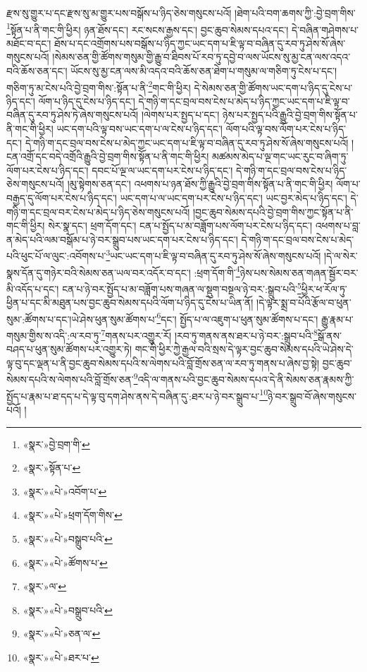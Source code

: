 རྫས་སུ་གྱུར་པ་དང་རྫས་སུ་མ་གྱུར་པས་བསྒོས་པ་ཉིད་ཅེས་གསུངས་པའོ། །ཐེག་པའི་བག་ཆགས་ཀྱི་:བྱེ་བྲག་གིས་\footnote{«སྣར་»བྱེ་བྲག་གི་}སྟོན་པ་ནི་གང་གི་ཕྱིར། ཉན་ཐོས་དང་། རང་སངས་རྒྱས་དང་། བྱང་ཆུབ་སེམས་དཔའ་དང་། དེ་བཞིན་གཤེགས་པ་མཐོང་བ་དང་། ཐོས་པ་དང་འགྲོགས་པས་བསྒོས་པ་ཉིད་ཀྱང་ཡང་དག་པ་ཇི་ལྟ་བ་བཞིན་དུ་རབ་ཏུ་ཤེས་སོ་ཞེས་གསུངས་པའོ། །སེམས་ཅན་གྱི་ཚོགས་གསུམ་གྱི་རྒྱུ་བ་ཐིབས་པོ་རབ་ཏུ་དབྱེ་བ་ལས་ཡོངས་སུ་མྱ་ངན་ལས་འདའ་བའི་ཆོས་ཅན་དང་། ཡོངས་སུ་མྱ་ངན་ལས་མི་འདའ་བའི་ཆོས་ཅན་ཐེག་པ་གསུམ་ལ་གཅིག་ཏུ་ངེས་པ་དང་། གཅིག་ཏུ་མ་ངེས་པའི་བྱེ་བྲག་གིས་:སྟོན་པ་ནི་\footnote{«སྣར་»སྟོན་པ་}གང་གི་ཕྱིར། དེ་སེམས་ཅན་གྱི་ཚོགས་ཡང་དག་པ་ཉིད་དུ་ངེས་པ་ཉིད་དང་། ལོག་པ་ཉིད་དུ་ངེས་པ་ཉིད་དང་། དེ་གཉི་ག་དང་བྲལ་བས་ངེས་པ་མེད་པ་ཉིད་ཀྱང་ཡང་དག་པ་ཇི་ལྟ་བ་བཞིན་དུ་རབ་ཏུ་ཤེས་ཏེ་ཞེས་གསུངས་པའོ། །ལེགས་པར་སྤྱད་པ་དང་། ཉེས་པར་སྤྱད་པའི་རྒྱུའི་བྱེ་བྲག་གིས་སྟོན་པ་ནི་གང་གི་ཕྱིར། ཡང་དག་པའི་ལྟ་བས་ཡང་དག་པ་ལ་ངེས་པ་ཉིད་དང་། ལོག་པའི་ལྟ་བས་ལོག་པར་ངེས་པ་ཉིད་དང་། དེ་གཉི་ག་དང་བྲལ་བས་ངེས་པ་མེད་ཀྱང་ཡང་དག་པ་ཇི་ལྟ་བ་བཞིན་དུ་རབ་ཏུ་ཤེས་སོ་ཞེས་གསུངས་པའོ། །ངན་འགྲོ་དང་བདེ་འགྲོའི་རྒྱུའི་བྱེ་བྲག་གིས་སྟོན་པ་ནི་གང་གི་ཕྱིར། མཚམས་མེད་པ་ལྔ་གང་ཡང་རུང་བ་ཞིག་ཏུ་ལོག་པར་ངེས་པ་ཉིད་དང་། དབང་པོ་ལྔ་ལ་ཡང་དག་པར་ངེས་པ་ཉིད་དང་། དེ་གཉི་ག་དང་བྲལ་བས་ངེས་པ་ཉིད་ཅེས་གསུངས་པའོ། །མུ་སྟེགས་ཅན་དང་། འཕགས་པ་ཉན་ཐོས་ཀྱི་རྒྱུའི་བྱེ་བྲག་གིས་སྟོན་པ་ནི་གང་གི་ཕྱིར། ལོག་པ་བརྒྱད་དུ་ལོག་པར་ངེས་པ་ཉིད་དང་། ཡང་དག་པ་ལ་ཡང་དག་པར་ངེས་པ་ཉིད་དང་། ཡང་བྱར་མེད་པ་ཉིད་དང་། དེ་གཉི་ག་དང་བྲལ་བར་ངེས་པ་མེད་པ་ཉིད་ཅེས་གསུངས་པའོ། །བྱང་ཆུབ་སེམས་དཔའི་བྱེ་བྲག་གིས་ཀྱང་སྟོན་པ་ནི་གང་གི་ཕྱིར། སེར་སྣ་དང་། ཕྲག་དོག་དང་། ངན་པ་སྤྱོད་པ་མ་བཟློག་པས་ལོག་པར་ངེས་པ་ཉིད་དང་། འཕགས་པ་བླ་ན་མེད་པའི་ལམ་བསྒོམ་པ་ཉེ་བར་སྒྲུབ་པས་ཡང་དག་པར་ངེས་པ་ཉིད་དང་། དེ་གཉི་ག་དང་བྲལ་བས་ངེས་པ་མེད་པའི་ཕུང་པོ་ལ་ལུང་:འབོགས་པ་\footnote{«སྣར་»«པེ་»འབོག་པ་}ཡང་ཡང་དག་པ་ཇི་ལྟ་བ་བཞིན་དུ་རབ་ཏུ་ཤེས་སོ་ཞེས་གསུངས་པའོ། །དེ་ལ་སེར་སྣས་དོན་དུ་གཉེར་བའི་སེམས་ཅན་ཡལ་བར་འདོར་བ་དང་། :ཕྲག་དོག་གི་\footnote{«སྣར་»«པེ་»ཕྲག་དོག་གིས་}ཉེས་པས་སེམས་ཅན་གཞན་སྦྱོར་བར་མི་འདོད་པ་དང་། ངན་པ་ཉེ་བར་སྤྱོད་པ་མ་བཟློག་པས་གཞན་ལ་སྡུག་བསྔལ་ཉེ་བར་:སྒྲུབ་པའི་\footnote{«སྣར་»«པེ་»བསྒྲུབ་པའི་}ཕྱིར་ཕ་རོལ་ཏུ་ཕྱིན་པ་དང་མི་མཐུན་པས་བྱང་ཆུབ་སེམས་དཔའི་ལོག་པ་ཉིད་དུ་ངེས་པ་ཡིན་ནོ། །དེ་ལྟར་སྨྲ་བ་པོའི་རྩོལ་བ་ཕུན་སུམ་:ཚོགས་པ་དང་།ཡེ་ཤེས་ཕུན་སུམ་ཚོགས་པ་\footnote{«སྣར་»«པེ་»ཚོགས་པ་}དང་། སྤྱོད་པ་ལ་འཇུག་པ་ཕུན་སུམ་ཚོགས་པ་དང་། རྒྱུ་རྣམ་པ་གསུམ་གྱིས་ས་འདི་:ལ་རབ་ཏུ་\footnote{«སྣར་»ལ་}གནས་པར་འགྱུར་རོ། །རབ་ཏུ་གནས་ནས་ཐར་པ་ཉེ་བར་:སྒྲུབ་པའི་\footnote{«སྣར་»«པེ་»བསྒྲུབ་པའི་}སྒོ་ནས་བཤད་པ་ཕུན་སུམ་ཚོགས་པར་འགྱུར་ཏེ། གང་གི་ཕྱིར་ཀྱེ་རྒྱལ་བའི་སྲས་དེ་ལྟར་བྱང་ཆུབ་སེམས་དཔའི་ཡེ་ཤེས་དེ་ལྟ་བུ་དང་ལྡན་པ་ནི་བྱང་ཆུབ་སེམས་དཔའི་ས་ལེགས་པའི་བློ་གྲོས་ཅན་ལ་རབ་ཏུ་གནས་པ་ཞེས་བྱ་སྟེ། བྱང་ཆུབ་སེམས་དཔའི་ས་ལེགས་པའི་བློ་གྲོས་ཅན་\footnote{«སྣར་»«པེ་»ཅན་ལ་}འདི་ལ་གནས་པའི་བྱང་ཆུབ་སེམས་དཔའ་དེ་ནི་སེམས་ཅན་རྣམས་ཀྱི་སྤྱོད་པ་རྣམ་པ་ཐ་དད་པ་དེ་ལྟ་བུ་དག་ཤེས་ནས་དེ་བཞིན་དུ་:ཐར་པ་ཉེ་བར་སྒྲུབ་པ་\footnote{«སྣར་»«པེ་»ཐར་པ་}ཉེ་བར་སྒྲུབ་བོ་ཞེས་གསུངས་པའོ། །
